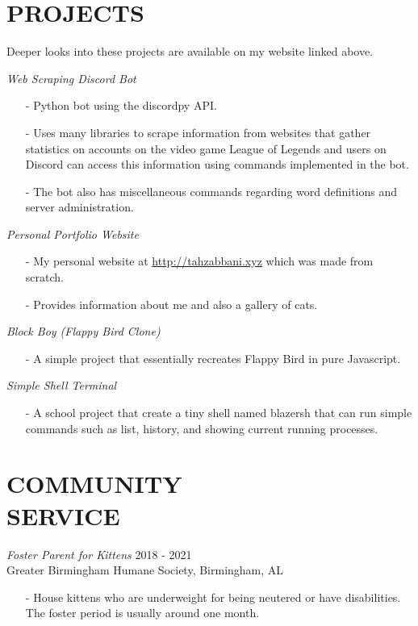 \documentclass[margin, 10pt]{res} %
\begin{document}
\begin{resume}
\section{PROJECTS}

Deeper looks into these projects are available on my website linked above.

{\sl Web Scraping Discord Bot}
\begin{itemize} \itemsep -2pt %
\item[-] Python bot using the discordpy API.
\item[-] Uses many libraries to scrape information from websites that gather statistics on accounts on the video game League of Legends and users on Discord can access this information using commands implemented in the bot.
\item[-] The bot also has miscellaneous commands regarding word definitions and server administration.
\end{itemize}

{\sl Personal Portfolio Website}
\begin{itemize} \itemsep -2pt %
\item[-] My personal website at \url{http://tahzabbani.xyz} which was made from scratch.
\item[-] Provides information about me and also a gallery of cats.
\end{itemize}

{\sl Block Boy (Flappy Bird Clone)}
\begin{itemize} \itemsep -2pt %
\item[-] A simple project that essentially recreates Flappy Bird in pure Javascript.
\end{itemize}

{\sl Simple Shell Terminal}
\begin{itemize} \itemsep -2pt %
\item[-] A school project that create a tiny shell named blazersh that can run simple commands such as list, history, and showing current running processes.
\end{itemize}

\section{COMMUNITY \\ SERVICE}

{\sl Foster Parent for Kittens} \hfill 2018 - 2021 \\
Greater Birmingham Humane Society, Birmingham, AL
\begin{itemize} 
\item[-] House kittens who are underweight for being neutered or have disabilities. The foster period is usually around one month.
\end{itemize}



\end{resume}
\end{document}
